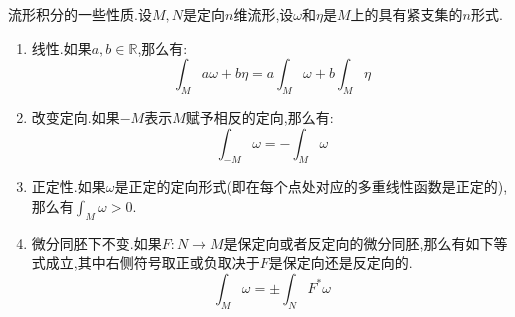 流形积分的一些性质.设$M,N$是定向$n$维流形,设$\omega$和$\eta$是$M$上的具有紧支集的$n$形式.
\begin{enumerate}
	\item 线性.如果$a,b\in\mathbb{R}$,那么有:
	$$\int_Ma\omega+b\eta=a\int_M\omega+b\int_M\eta$$
	\item 改变定向.如果$-M$表示$M$赋予相反的定向,那么有:
	$$\int_{-M}\omega=-\int_M\omega$$
	\item 正定性.如果$\omega$是正定的定向形式(即在每个点处对应的多重线性函数是正定的),那么有$\int_M\omega>0$.
	\item 微分同胚下不变.如果$F:N\to M$是保定向或者反定向的微分同胚,那么有如下等式成立,其中右侧符号取正或负取决于$F$是保定向还是反定向的.
    $$\int_M\omega=\pm\int_NF^*\omega$$
\end{enumerate}

